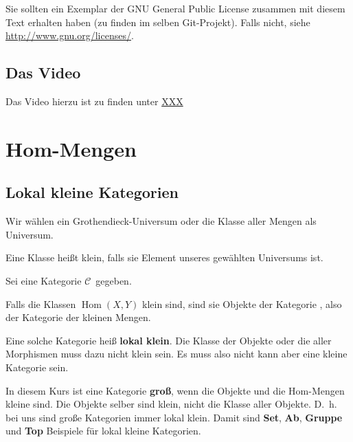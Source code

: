 \documentclass[a4paper]{amsart}
\theoremstyle{definition}
\DeclareMathOperator{\Hom}{Hom}
\newcommand{\CC}{\ensuremath{\mathcal{ C }}}
\newcommand{\Set}{\text{\textbf{Set}}}
\begin{document}
Sie sollten ein Exemplar der GNU General Public License zusammen mit diesem Text erhalten haben
(zu finden im selben Git-Projekt).
Falls nicht, siehe \url{http://www.gnu.org/licenses/}.

\subsection*{Das Video}
Das Video hierzu ist zu finden unter
{\tiny
   \url{XXX}
}

\section{Hom-Mengen}

\subsection{Lokal kleine Kategorien}
Wir wählen ein Grothendieck-Universum oder die Klasse aller Mengen als Universum.

Eine Klasse heißt klein, falls sie Element unseres gewählten Universums ist. 

Sei eine Kategorie \CC\ gegeben.

Falls die Klassen $\Hom(X,Y)$ klein sind, sind sie Objekte der Kategorie \Set, also der Kategorie der kleinen Mengen.

Eine solche Kategorie heiß \textbf{lokal klein}. Die Klasse der Objekte oder die aller Morphismen muss dazu nicht klein sein. Es muss also nicht kann aber eine kleine Kategorie sein.

In diesem Kurs ist eine Kategorie \textbf{groß}, wenn die Objekte und die Hom-Mengen kleine sind. Die Objekte selber sind klein, nicht die Klasse aller Objekte. D.~h. bei uns sind große Kategorien immer lokal klein. Damit sind \textbf{Set}, \textbf{Ab}, \textbf{Gruppe} und \textbf{Top} Beispiele für lokal kleine Kategorien.
\end{document}
